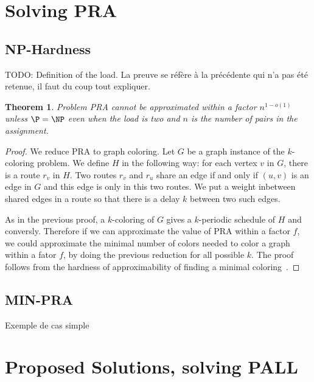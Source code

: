 \documentclass[a4paper,10pt]{article}
\newtheorem{theorem}{Theorem}
\newcommand{\todo}[1]{{\color{red} TODO: {#1}}}
\begin{document}
	

  
\section{Solving PRA}
  \label{sec:complexity}
  \subsection{NP-Hardness}
	
   \todo{Definition of the load. La preuve se réfère à la précédente qui n'a pas été retenue, il faut du coup tout expliquer.}
   
   
    \begin{theorem}
    Problem PRA cannot be approximated within a factor $n^{1-o(1)}$ unless $\P = \NP$ even when the load is two
    and $n$ is the number of pairs in the assignment.
    \end{theorem}

    \begin{proof}
    We reduce PRA to graph coloring. Let $G$ be a graph instance of the $k$-coloring problem. 
    We define $H$ in the following way: for each vertex $v$ in $G$, there is a route $r_v$ in $H$.
    Two routes $r_v$ and $r_u$ share an edge if and only if $(u,v)$ is an edge in $G$ and this edge is only in this two routes. 
    We put a weight inbetween shared edges in a route so that there is a delay $k$ between two such edges. 
    
    As in the previous proof, a $k$-coloring of $G$ gives a $k$-periodic schedule of $H$
    and conversly. Therefore if we can approximate the value of PRA  within a factor $f$,
    we could approximate the minimal number of colors needed to color a graph within a fator $f$, 
    by doing the previous reduction for all possible $k$. The proof follows from the hardness of approximability
    of finding a minimal coloring~\cite{zuckerman2006linear}.
    \end{proof}


   
  \subsection{MIN-PRA}
    Exemple de cas simple
    
\section{Proposed Solutions, solving PALL}
  
\end{document}
